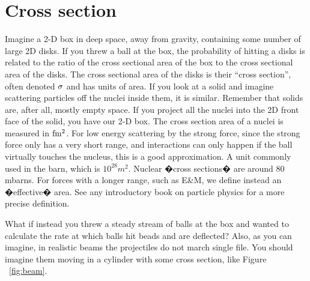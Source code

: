 \section{Cross section}
Imagine a 2-D box in deep space, away from gravity, containing some number of large 2D disks.  If you threw a ball at the box, the probability of hitting a disks is related to the ratio of the cross sectional area of the box to the cross sectional area of the disks.  The cross sectional area of the disks is their 
``cross section'', often denoted ${\rm \sigma}$ and has units of area.  
If you look at a solid and imagine scattering particles off the nuclei inside them, it is similar.  Remember that solids are, after all, mostly empty space.  If you project all the nuclei into the 2D front face of the solid, you have our 2-D box.  The cross section area of a nuclei is measured in ${\rm fm^{2}}$.  
For low energy scattering by the strong force, since the strong force only has a very short range, and interactions can only happen if the ball virtually touches the nucleus, this is a good approximation.  A unit commonly used in the barn, which is \(10^{28} m^{2}\).  Nuclear �cross sections� are around 80 mbarns.  For forces with a longer range, such as E\&M, we define instead an �effective� area.  See any introductory book on particle physics for a more precise definition.

What if instead you threw a steady stream of balls at the box and wanted to calculate the rate at which balls hit beads and are deflected?  Also, as you can imagine, in realistic beams the projectiles do not march single file.  You should imagine them moving in a cylinder with some cross section, like Figure ~\ref{fig:beam}.

